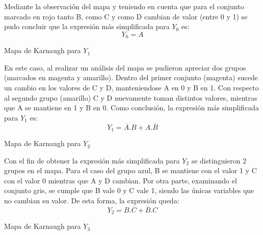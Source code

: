 \noindent
Mediante la observaci\'on del mapa y teniendo en cuenta que para el conjunto marcado en rojo tanto B, como C y como D cambian de valor (entre 0 y 1) se pudo concluir que la expresi\'on m\'as simplificada para $Y_0$ es:
\begin{equation}
    Y_0 = A
    \label{ecy0}
\end{equation}

\begin{center}
Mapa de Karnaugh para $Y_1$

\begin{Karnaugh2}
    \centering
\end{Karnaugh2}
\end{center}

\noindent
En este caso, al realizar un an\'alisis del mapa se pudieron apreciar dos grupos (marcados en magenta y amarillo). Dentro del primer conjunto (magenta) sucede un cambio en los valores de C y D, manteniendose A en 0 y B en 1. Con respecto al segundo grupo (amarillo) C y D nuevamente toman distintos valores, mientras que A se mantiene en 1 y B en 0. Como conclusi\'on, la expresi\'on m\'as simplificada para $Y_1$ es: 
\begin{equation}
    Y_1 = \overline{A}.B
 + A.\overline{B}
 \label{ecy1}
\end{equation}

\begin{center}
Mapa de Karnaugh para $Y_2$

\begin{Karnaugh2}
    \centering
\end{Karnaugh2}
\end{center}

\noindent
Con el fin de obtener la expresi\'on m\'as simplificada para $Y_2$ se distinguieron 2 grupos en el mapa. Para el caso del grupo azul, B se mantiene con el valor 1 y C con el valor 0 mientras que A y D cambian. Por otra parte, examinando el conjunto gris, se cumple que B vale 0 y C vale 1, siendo las \'unicas variables que no cambian su valor. De esta forma, la expresi\'on queda:
\begin{equation}
    Y_2 = B.\overline{C}
 + \overline{B}.C
 \label{ecy2}
\end{equation}
\begin{center}
Mapa de Karnaugh para $Y_3$

\begin{Karnaugh2}
    \centering
\end{Karnaugh2}
\end{center}

